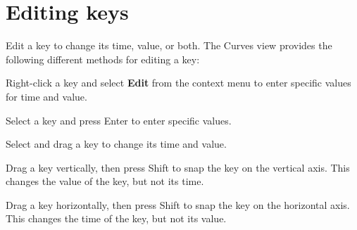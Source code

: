 \chapter{Editing keys}
\hypertarget{md__library_2_package_cache_2com_8unity_8timeline_0d1_87_86_2_documentation_0i_2crv__keys__edit}{}\label{md__library_2_package_cache_2com_8unity_8timeline_0d1_87_86_2_documentation_0i_2crv__keys__edit}
\label{md__library_2_package_cache_2com_8unity_8timeline_0d1_87_86_2_documentation_0i_2crv__keys__edit_autotoc_md1138}%
%
 Edit a key to change its time, value, or both. The Curves view provides the following different methods for editing a key\+:


\begin{DoxyItemize}
\item Right-\/click a key and select {\bfseries{Edit}} from the context menu to enter specific values for time and value.
\item Select a key and press Enter to enter specific values.
\item Select and drag a key to change its time and value.
\item Drag a key vertically, then press Shift to snap the key on the vertical axis. This changes the value of the key, but not its time.
\item Drag a key horizontally, then press Shift to snap the key on the horizontal axis. This changes the time of the key, but not its value. 
\end{DoxyItemize}
